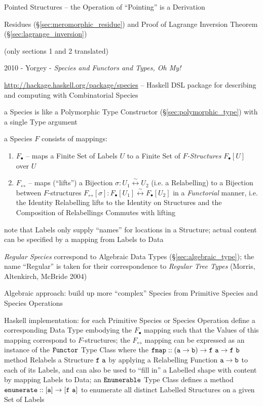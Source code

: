Pointed Structures -- the Operation of ``Pointing'' is a Derivation

Residues (\S\ref{sec:meromorphic_residue}) and Proof of Lagrange Inversion
Theorem (\S\ref{sec:lagrange_inversion})

(only sections 1 and 2 translated)

\asterism

2010 - Yorgey - \emph{Species and Functors and Types, Oh My!}

\url{http://hackage.haskell.org/package/species} -- Haskell DSL package for
describing and computing with Combinatorial Species

a Species is like a Polymorphic Type Constructor (\S\ref{sec:polymorphic_type})
with a single Type argument

a Species $F$ consists of mappings:
\begin{enumerate}
  \item $F_\bullet$ -- maps a Finite Set of Labels $U$ to a Finite Set of
    \emph{$F$-Structures} $F_\bullet[U]$ over $U$
  \item $F_\leftrightarrow$ -- maps (``lifts'') a Bijection
    $\sigma : U_1 \stackrel{\sim}{\leftrightarrow} U_2$ (i.e. a Relabelling) to
    a Bijection between $F$-structures
    $F_\leftrightarrow[\sigma] : F_\bullet[U_1] \stackrel{\sim}{\leftrightarrow}
    F_\bullet[U_2]$
    in a \emph{Functorial} manner, i.e. the Identity Relabelling lifts to the
    Identity on Structures and the Composition of Relabellings Commutes with
    lifting
\end{enumerate}

note that Labels only supply ``names'' for locations in a Structure; actual
content can be specified by a mapping from Labels to Data

\emph{Regular Species} correspond to Algebraic Data Types
(\S\ref{sec:algebraic_type}); the name ``Regular'' is taken for their
correspondence to \emph{Regular Tree Types} (Morris, Altenkirch, McBride 2004)

Algebraic approach: build up more ``complex'' Species from Primitive Species and
Species Operations

Haskell implementation: for each Primitive Species or Species Operation define a
corresponding Data Type embodying the $F_\bullet$ mapping such that the Values
of this mapping correspond to $F$-structures; the $F_\leftrightarrow$ mapping
can be expressed as an instance of the $\mathtt{Functor}$ Type Class where the
$\mathtt{fmap :: (a \rightarrow b) \rightarrow f\ a \rightarrow f\ b}$ method
Relabels a Structure $\mathtt{f\ a}$ by applying a Relabelling Function $\mathtt{a
  \rightarrow b}$ to each of its Labels, and can also be used to ``fill in'' a
Labelled shape with content by mapping Labels to Data; an $\mathtt{Enumerable}$
Type Class defines a method $\mathtt{enumerate :: [a] \rightarrow [f\ a]}$ to
enumerate all distinct Labelled Structures on a given Set of Labels

